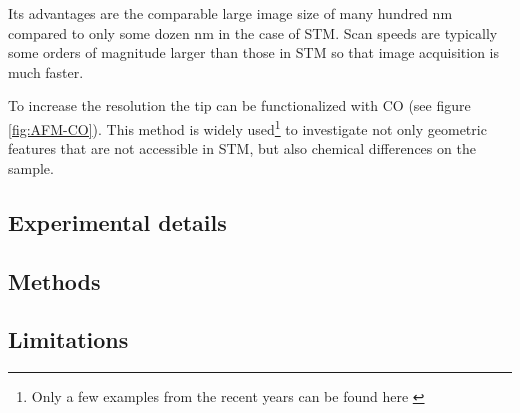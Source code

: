 Its advantages are the comparable large image size of many hundred \si{\nm} compared to only some dozen \si{\nm} in the case of STM. Scan speeds are typically some orders of magnitude larger than those in STM so that image acquisition is much faster.

To increase the resolution the tip can be functionalized with CO (see figure \ref{fig:AFM-CO}). This method is widely used\footnote{Only a few examples from the recent years can be found here \cite{albrecht_direct_2016, kawai_multiple_2018, kawai_atomically_2015, schulz_elemental_2018, gross_chemical_2009, pavlicek_generation_2017, schwarz_corrugation_2017}} to investigate not only geometric features that are not accessible in STM, but also chemical differences on the sample\cite{wang_exploration_2017}.

\subsection{Experimental details}
\subsection{Methods}
\subsection{Limitations}